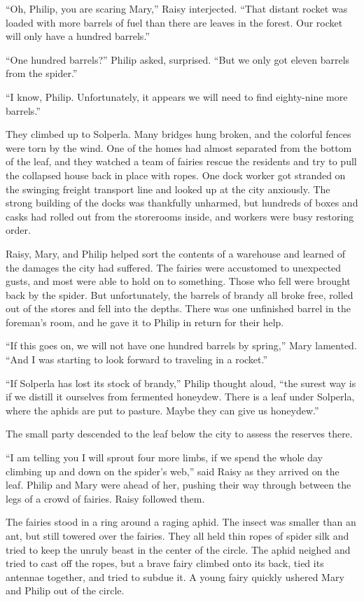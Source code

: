 \documentclass[10pt]{memoir}
\begin{document}
``Oh, Philip, you are scaring Mary,'' Raisy interjected. ``That distant rocket
was loaded with more barrels of fuel than there are leaves in the forest. Our
rocket will only have a hundred barrels.''

``One hundred barrels?'' Philip asked, surprised. ``But we only got eleven
barrels from the spider.''

``I know, Philip. Unfortunately, it appears we will need to find eighty-nine
more barrels.''

They climbed up to Solperla. Many bridges hung broken, and the colorful fences
were torn by the wind. One of the homes had almost separated from the bottom of
the leaf, and they watched a team of fairies rescue the residents and try to
pull the collapsed house back in place with ropes. One dock worker got stranded
on the swinging freight transport line and looked up at the city anxiously.
The strong building of the docks was thankfully unharmed, but hundreds of boxes
and casks had rolled out from the storerooms inside, and workers were busy
restoring order.

Raisy, Mary, and Philip helped sort the contents of a warehouse and learned of
the damages the city had suffered. The fairies were accustomed to unexpected
gusts, and most were able to hold on to something. Those who fell were brought
back by the spider. But unfortunately, the barrels of brandy all broke free,
rolled out of the stores and fell into the depths. There was one unfinished
barrel in the foreman's room, and he gave it to Philip in return for their
help.

``If this goes on, we will not have one hundred barrels by spring,'' Mary
lamented. ``And I was starting to look forward to traveling in a rocket.''

``If Solperla has lost its stock of brandy,'' Philip thought aloud, ``the
surest way is if we distill it ourselves from fermented honeydew. There is a
leaf under Solperla, where the aphids are put to pasture. Maybe they can give
us honeydew.''

The small party descended to the leaf below the city to assess the reserves
there.

``I am telling you I will sprout four more limbs, if we spend the whole day
climbing up and down on the spider's web,'' said Raisy as they arrived on the
leaf. Philip and Mary were ahead of her, pushing their way through between the
legs of a crowd of fairies. Raisy followed them.

The fairies stood in a ring around a raging aphid. The insect was smaller than
an ant, but still towered over the fairies. They all held thin ropes of spider
silk and tried to keep the unruly beast in the center of the circle. The aphid
neighed and tried to cast off the ropes, but a brave fairy climbed onto its
back, tied its antennae together, and tried to subdue it. A young fairy quickly
ushered Mary and Philip out of the circle.
\end{document}
